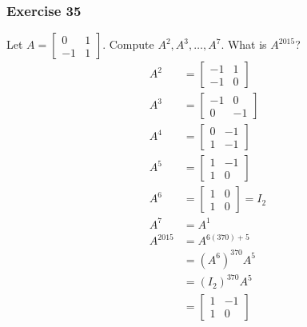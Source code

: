 \documentclass{math}
\begin{document}
\subsubsection*{Exercise 35}
Let \( A = \begin{bmatrix}0 & 1 \\ -1 & 1\end{bmatrix} \). Compute \( A^2,A^3,
\dots,A^7 \). What is \( A^{2015} \)?
\begin{align*}
  A^2 &= \begin{bmatrix}-1 & 1 \\ -1 & 0\end{bmatrix} \\
  A^3 &= \begin{bmatrix}-1 & 0 \\ 0 & -1\end{bmatrix} \\
  A^4 &= \begin{bmatrix}0 & -1 \\ 1 & -1\end{bmatrix} \\
  A^5 &= \begin{bmatrix}1 & -1 \\ 1 & 0\end{bmatrix} \\
  A^6 &= \begin{bmatrix}1 & 0 \\ 1 & 0\end{bmatrix} = I_2 \\
  A^7 &= A^1 \\
  A^{2015} &= A^{6(370)+5} \\
  &= (A^6)^{370}A^5 \\
  &= (I_2)^{370}A^5 \\
  &= \begin{bmatrix}1 & -1 \\ 1 & 0\end{bmatrix}
\end{align*}
\end{document}
